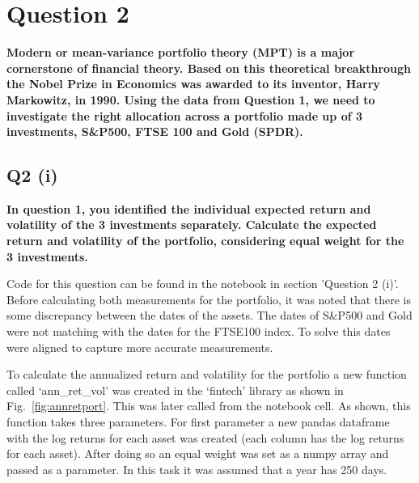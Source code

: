 \section{Question 2}\label{ssec:pt1q2}
\textbf{Modern or mean-variance portfolio theory (MPT) is a major cornerstone of financial theory. Based
on this theoretical breakthrough the Nobel Prize in Economics was awarded to its inventor, Harry
Markowitz, in 1990. Using the data from Question 1, we need to investigate the right allocation
across a portfolio made up of 3 investments, S\&P500, FTSE 100 and Gold (SPDR). }



\subsection{Q2 (i)}\label{sssec:pt1q2i}
\textbf{In question 1, you identified the individual expected return and volatility of the 3 investments
separately. Calculate the expected return and volatility of the portfolio, considering equal weight for the 3 investments. }

\noindent
Code for this question can be found in the notebook in section 'Question 2 (i)'. Before calculating both measurements for the portfolio, it was noted that there is some discrepancy between the dates of the assets. The dates of S\&P500 and Gold were not matching with the dates for the FTSE100 index. To solve this dates were aligned to capture more accurate measurements. 

\noindent
To calculate the annualized return and volatility for the portfolio a new function called ‘ann\_ret\_vol’ was created in the ‘fintech’ library as shown in Fig.~\ref{fig:annretport}. This was later called from the notebook cell. As shown, this function takes three parameters. For first parameter a new pandas dataframe with the log returns for each asset was created (each column has the log returns for each asset). After doing so an equal weight was set as a numpy array and passed as a parameter. In this task it was assumed that a year has 250 days. 


